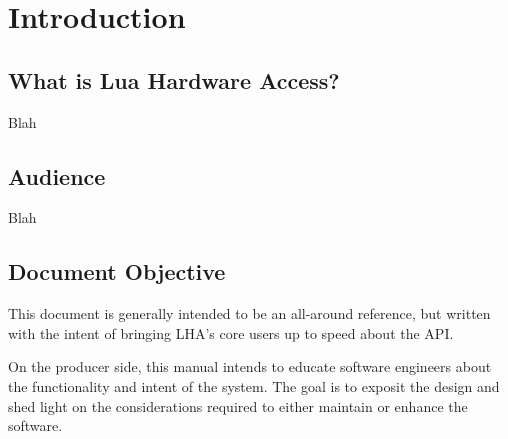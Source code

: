 

\section{Introduction}

\subsection{What is Lua Hardware Access?}

Blah

\subsection{Audience}

Blah

\subsection{Document Objective}

This document is generally intended to be an all-around reference, but written
with the intent of bringing LHA's core users up to speed about the
API.  

On the producer side, this manual intends to educate software engineers about
the functionality and intent of the system.  The goal is to exposit the design
and shed light on the considerations required to either maintain or enhance the
software.

